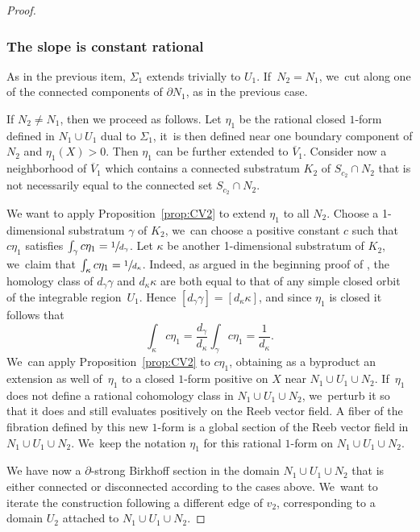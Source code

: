 \begin{proof}
\subsubsection*{The slope is constant rational} As in the previous item, $\Sigma_1$ extends trivially to $U_1$. If~$N_2=N_1$, we~cut along one of the connected components of $\partial N_1$, as in the previous case.

If $N_2\neq N_1$, then we proceed as follows. Let $\eta_1$ be the rational closed $1$-form defined in $N_1\cup U_1$ dual to $\Sigma_1$, it~is then defined near one boundary component of $N_2$ and $\eta_1(X)>0$. Then $\eta_1$ can be further extended to $\overline V_1$. Consider now a neighborhood of $\overline{V}_1$ which contains a connected substratum $K_2$ of $S_{c_2}\cap N_2$ that is not necessarily equal to the connected set $S_{c_2}\cap N_2$.

We want to apply Proposition~\ref{prop:CV2} to extend $\eta_1$ to all $N_2$. Choose a 1-dimensional substratum $\gamma$ of $K_2$, we~can choose a positive constant $c$ such that $c\eta_1$ satisfies $\int_\gamma c\eta_1=\sfrac{1}{d_{\gamma}}$. Let $\kappa$ be another 1-dimensional substratum of $K_2$, we~claim that $\int_{\kappa} c\eta_1=\sfrac{1}{d_{\kappa}}$. Indeed, as argued in the beginning proof of \cite[Prop.\,3.2]{CV2}, the homology class of $d_{\gamma}\gamma$ and $d_{\kappa}\kappa$ are both equal to that of any simple closed orbit of the integrable region~$U_1$. Hence $[d_{\gamma}\gamma]=[d_{\kappa}\kappa]$, and since $\eta_1$ is closed it follows that
\[
\int_{\kappa} c\eta_1= \frac{d_{\gamma}}{d_{\kappa}} \int_\gamma c\eta_1=\frac{1}{d_{\kappa}}.
\]
We~can apply Proposition~\ref{prop:CV2} to $c\eta_1$, obtaining as a byproduct an extension as well of~$\eta_1$ to a closed $1$-form positive on $X$ near $N_1\cup U_1\cup N_2$. If~$\eta_1$ does not define a rational cohomology class in $N_1\cup U_1\cup N_2$, we~perturb it so that it does and still evaluates positively on the Reeb vector field. A fiber of the fibration defined by this new $1$-form is a global section of the Reeb vector field in $N_1\cup U_1\cup N_2$. We~keep the notation $\eta_1$ for this rational $1$-form on $N_1\cup U_1\cup N_2$.

We have now a $\partial$-strong Birkhoff section in the domain $N_1\cup U_1\cup N_2$ that is either connected or disconnected according to the cases above. We~want to iterate the construction following a different edge of $v_2$, corresponding to a domain $U_2$ attached to $N_1\cup U_1\cup N_2$.


\end{proof}
